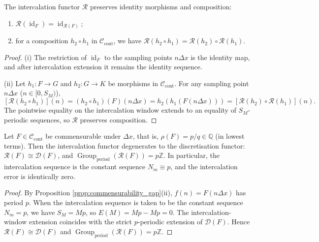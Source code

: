\begin{theorem}\label{thm:intercalation_functoriality}
The intercalation functor $\mathcal{R}$ preserves identity morphisms and composition:
\begin{enumerate}[label=(\roman*)]
    \item $\mathcal{R}(\operatorname{id}_F)=\operatorname{id}_{\mathcal{R}(F)}$;
    \item for a composition $h_2\circ h_1$ in $\mathcal{C}_{\text{cont}}$, we have $\mathcal{R}(h_2\circ h_1)=\mathcal{R}(h_2)\circ\mathcal{R}(h_1)$.
\end{enumerate}
\end{theorem}

\begin{proof}
(i) The restriction of $\operatorname{id}_F$ to the sampling points $n\Delta x$ is the identity map, and after intercalation extension it remains the identity sequence.

(ii) Let $h_1:F\to G$ and $h_2:G\to K$ be morphisms in $\mathcal{C}_{\text{cont}}$. For any sampling point $n\Delta x$ ($n\in[0,S_M)$),
\[
[\mathcal{R}(h_2\circ h_1)](n)=(h_2\circ h_1)(F)(n\Delta x)=h_2(h_1(F(n\Delta x)))=[\mathcal{R}(h_2)\circ\mathcal{R}(h_1)](n).
\]
The pointwise equality on the intercalation window extends to an equality of $S_M$-periodic sequences, so $\mathcal{R}$ preserves composition.
\end{proof}

\begin{proposition}\label{prop:intercalation_rational_degeneracy}
Let $F\in\mathcal{C}_{\text{cont}}$ be commensurable under $\Delta x$, that is, $\rho(F)=p/q\in\mathbb{Q}$ (in lowest terms). Then the intercalation functor degenerates to the discretisation functor: $\mathcal{R}(F)\cong\mathcal{D}(F)$, and $\operatorname{Group}_{\mathrm{period}}(\mathcal{R}(F))=p\mathbb{Z}$. In particular, the intercalation sequence is the constant sequence $N_m\equiv p$, and the intercalation error is identically zero.
\end{proposition}

\begin{proof}
By Proposition \ref{prop:commensurability_gap}(ii), $f(n)=F(n\Delta x)$ has period $p$. When the intercalation sequence is taken to be the constant sequence $N_m=p$, we have $S_M=Mp$, so $E(M)=Mp-Mp=0$. The intercalation-window extension coincides with the strict $p$-periodic extension of $\mathcal{D}(F)$. Hence $\mathcal{R}(F)\cong\mathcal{D}(F)$ and $\operatorname{Group}_{\mathrm{period}}(\mathcal{R}(F))=p\mathbb{Z}$.
\end{proof}

